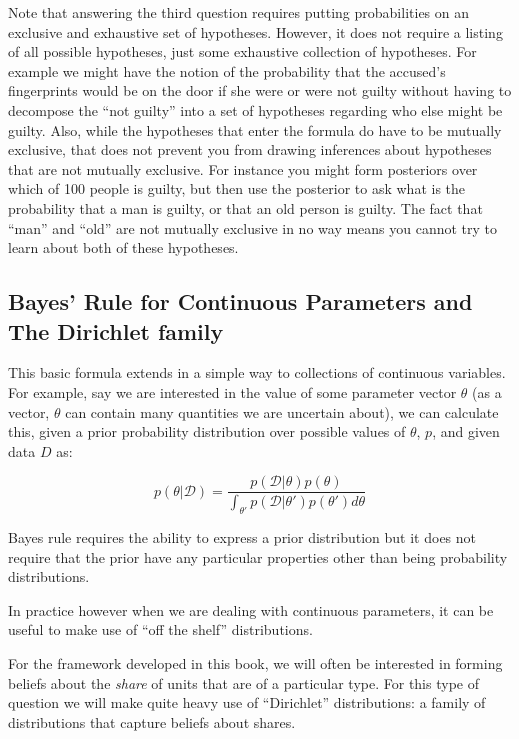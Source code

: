 \documentclass[
  12pt,
]{book}
\begin{document}
Note that answering the third question requires putting probabilities on an exclusive and exhaustive set of hypotheses. However, it does not require a listing of all possible hypotheses, just some exhaustive collection of hypotheses. For example we might have the notion of the probability that the accused's fingerprints would be on the door if she were or were not guilty without having to decompose the ``not guilty'' into a set of hypotheses regarding who else might be guilty. Also, while the hypotheses that enter the formula do have to be mutually exclusive, that does not prevent you from drawing inferences about hypotheses that are not mutually exclusive. For instance you might form posteriors over which of 100 people is guilty, but then use the posterior to ask what is the probability that a man is guilty, or that an old person is guilty. The fact that ``man'' and ``old'' are not mutually exclusive in no way means you cannot try to learn about both of these hypotheses.

\hypertarget{bayes-rule-for-continuous-parameters-and-the-dirichlet-family}{%
\subsection{Bayes' Rule for Continuous Parameters and The Dirichlet family}\label{bayes-rule-for-continuous-parameters-and-the-dirichlet-family}}

This basic formula extends in a simple way to collections of continuous variables. For example, say we are interested in the value of some parameter vector \(\theta\) (as a vector, \(\theta\) can contain many quantities we are uncertain about), we can calculate this, given a prior probability distribution over possible values of \(\theta\), \(p\), and given data \(D\) as:

\[p(\theta|\mathcal{D})=\frac{p(\mathcal{D}|\theta)p(\theta)}{\int_{\theta'}p(\mathcal{D|\theta'})p(\theta')d\theta}\]

Bayes rule requires the ability to express a prior distribution but it does not require that the prior have any particular properties other than being probability distributions.

In practice however when we are dealing with continuous parameters, it can be useful to make use of ``off the shelf'' distributions.

For the framework developed in this book, we will often be interested in forming beliefs about the \emph{share} of units that are of a particular type. For this type of question we will make quite heavy use of ``Dirichlet'' distributions: a family of distributions that capture beliefs about shares.
\end{document}
